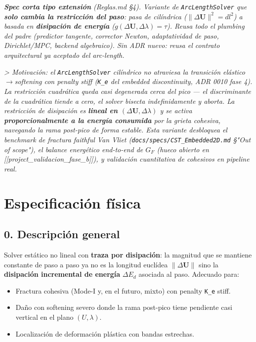 \documentclass[11pt,letterpaper,oneside]{report}
\begin{document}
\textit{\textbf{Spec corta tipo extensión} (Reglas.md §4). Variante de \texttt{ArcLengthSolver} que \textbf{solo cambia la restricción del paso}: pasa de cilíndrica ($\lVert\Delta\mathbf U\rVert^2 = dl^2$) a basada en \textbf{disipación de energía} ($g(\Delta\mathbf U, \Delta\lambda) = \tau$). Reusa todo el plumbing del padre (predictor tangente, corrector Newton, adaptatividad de paso, Dirichlet/MPC, backend algebraico). Sin ADR nuevo: reusa el contrato arquitectural ya aceptado del arc-length.}

\textit{> Motivación: el \texttt{ArcLengthSolver} cilíndrico no atraviesa la transición elástico\ensuremath{\to}softening con penalty stiff (\texttt{K\_e} del embedded discontinuity, ADR 0010 fase 4). La restricción cuadrática queda casi degenerada cerca del pico --- el discriminante de la cuadrática tiende a cero, el solver bisecta indefinidamente y aborta. La restricción de disipación es \textbf{lineal en $(\Delta\mathbf U, \Delta\lambda)$} y se activa \textbf{proporcionalmente a la energía consumida} por la grieta cohesiva, navegando la rama post-pico de forma estable. Esta variante desbloquea el benchmark de fractura faithful Van Vliet (\texttt{docs/specs/CST\_Embedded2D.md} §"Out of scope"), el balance energético end-to-end de $G_F$ (hueco abierto en [[project\_validacion\_fase\_b]]), y validación cuantitativa de cohesivos en pipeline real.}



\section{Especificación física}

\subsection{0. Descripción general}

Solver estático no lineal con \textbf{traza por disipación}: la magnitud que se mantiene constante de paso a paso ya no es la longitud euclídea $\lVert\Delta\mathbf U\rVert$ sino la \textbf{disipación incremental de energía} $\Delta E_d$ asociada al paso. Adecuado para:

\begin{itemize}
  \item Fractura cohesiva (Mode-I y, en el futuro, mixto) con penalty \texttt{K\_e} stiff.
  \item Daño con softening severo donde la rama post-pico tiene pendiente casi vertical en el plano $(U, \lambda)$.
  \item Localización de deformación plástica con bandas estrechas.
\end{itemize}
\end{document}
